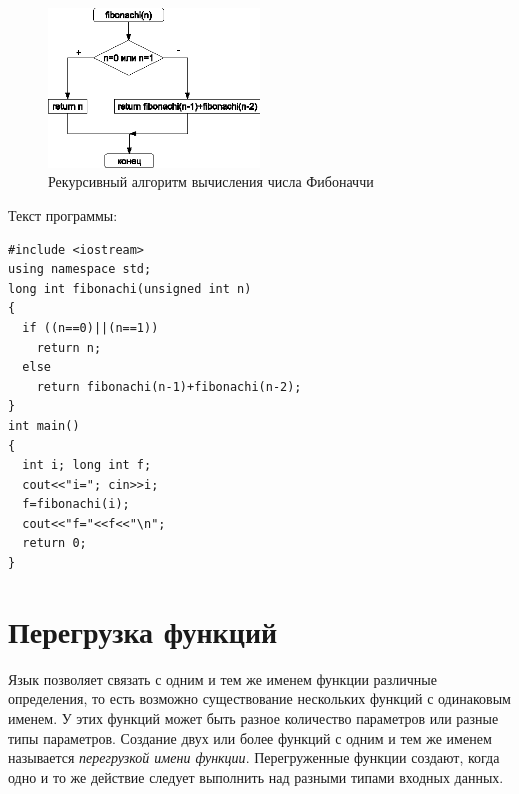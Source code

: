 \begin{figure}[htb]
\begin{center}
\includegraphics[width=0.5\textwidth]{img/ris_4_12}
\caption{Рекурсивный алгоритм вычисления числа Фибоначчи}
\label{ch04:refDrawing11}
\end{center}
\end{figure}

Текст программы:
\begin{lstlisting}
#include <iostream> 
using namespace std;
long int fibonachi(unsigned int n) 
{
  if ((n==0)||(n==1)) 
    return n; 
  else 
    return fibonachi(n-1)+fibonachi(n-2); 
}
int main()
{
  int i; long int f;
  cout<<"i="; cin>>i;
  f=fibonachi(i);
  cout<<"f="<<f<<"\n";
  return 0;
}
\end{lstlisting}

\section[Перегрузка функций]{Перегрузка функций}
Язык  позволяет связать с одним и тем же именем функции различные определения, то есть возможно существование
нескольких функций с одинаковым именем. У этих функций может быть разное количество параметров или разные типы
параметров. Создание двух или более функций с одним и тем же именем называется \emph{перегрузкой имени функции}. Перегруженные функции создают, когда одно и то же действие следует
выполнить над разными типами входных данных.

